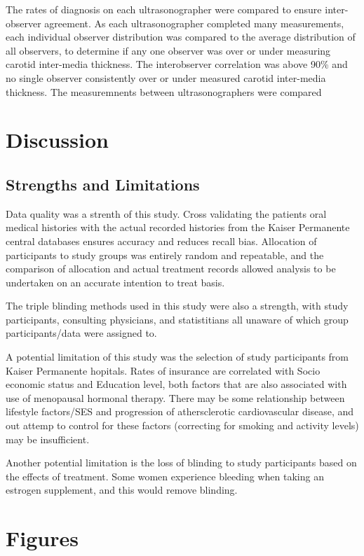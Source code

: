 \documentclass[11pt]{article}
\begin{document}
		
		The rates of diagnosis on each ultrasonographer were compared to ensure inter-observer agreement.
		As each ultrasonographer completed many measurements, each individual observer distribution was compared to the average distribution of all observers, to determine if any one observer was over or under measuring carotid inter-media thickness.
		The interobserver correlation was above 90\% and no single observer consistently over or under measured carotid inter-media thickness.
		The measuremnents between ultrasonographers were compared 


	\section{Discussion} 


	\subsection{Strengths and Limitations}
		Data quality was a strenth of this study.
		Cross validating the patients oral medical histories with the actual recorded histories from the Kaiser Permanente central databases ensures accuracy and reduces recall bias.
		Allocation of participants to study groups was entirely random and repeatable, and the comparison of allocation and actual treatment records allowed analysis to be undertaken on an accurate intention to treat basis. 


		The triple blinding methods used in this study were also a strength, with study participants, consulting physicians, and statistitians all unaware of which group participants/data were assigned to.


		A potential limitation of this study was the selection of study participants from Kaiser Permanente hopitals.
		Rates of insurance are correlated with Socio economic status and Education level, both factors that are also associated with use of menopausal hormonal therapy.
		There may be some relationship between lifestyle factors/SES and progression of athersclerotic cardiovascular disease, and out attemp to control for these factors (correcting for smoking and activity levels) may be insufficient.


		Another potential limitation is the loss of blinding to study participants based on the effects of treatment. Some women experience bleeding when taking an estrogen supplement, and this would remove blinding.
		
	\section{Figures}
\end{document}
